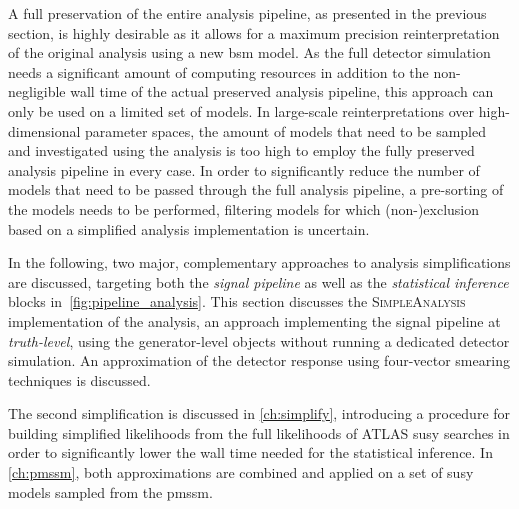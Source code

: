 A full preservation of the entire analysis pipeline, as presented in the previous section, is highly desirable as it allows for a maximum precision reinterpretation of the original analysis using a new \gls{bsm} model.
As the full detector simulation needs a significant amount of computing resources in addition to the non-negligible wall time of the actual preserved analysis pipeline, this approach can only be used on a limited set of models.
In large-scale reinterpretations over high-dimensional parameter spaces, the amount of models that need to be sampled and investigated using the analysis is too high to employ the fully preserved analysis pipeline in every case.
In order to significantly reduce the number of models that need to be passed through the full analysis pipeline, a pre-sorting of the models needs to be performed, filtering models for which (non-)exclusion based on a simplified analysis implementation is uncertain.

In the following, two major, complementary approaches to analysis simplifications are discussed, targeting both the \textit{signal pipeline} as well as the \textit{statistical inference} blocks in~\cref{fig:pipeline_analysis}.
This section discusses the \textsc{SimpleAnalysis} implementation of the analysis, an approach implementing the signal pipeline at \textit{truth-level}, \ie using the generator-level objects without running a dedicated detector simulation. An approximation of the detector response using four-vector smearing techniques is discussed.

The second simplification is discussed in \cref{ch:simplify}, introducing a procedure for building simplified likelihoods from the full likelihoods of ATLAS \gls{susy} searches in order to significantly lower the wall time needed for the statistical inference. 
In \cref{ch:pmssm}, both approximations are combined and applied on a set of \gls{susy} models sampled from the \gls{pmssm}.


